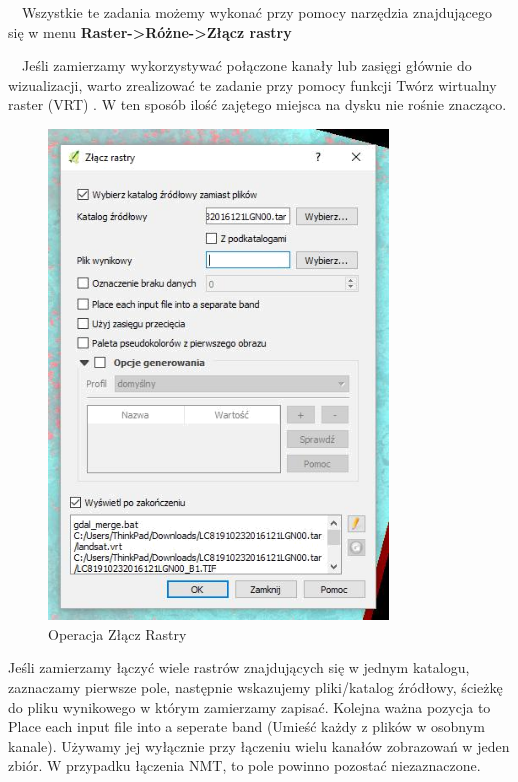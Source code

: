 \documentclass[12pt,a4paper]{book}
\begin{document}
\ \ Wszystkie te zadania możemy wykonać przy pomocy narzędzia znajdującego się w menu \textbf{Raster-{\textgreater}Różne-{\textgreater}Złącz rastry}

\ \ Jeśli zamierzamy wykorzystywać połączone kanały lub zasięgi głównie do wizualizacji, warto zrealizować te zadanie przy pomocy funkcji  Twórz wirtualny raster (VRT) . W ten sposób ilość zajętego miejsca na dysku nie rośnie znacząco.
\begin{figure}[!ht]
	\centering
	\includegraphics[height=13cm]{004-zlacz-rastry.png}
	\caption{Operacja Złącz Rastry}
\end{figure}

Jeśli zamierzamy łączyć wiele rastrów znajdujących się w jednym katalogu, zaznaczamy pierwsze pole, następnie wskazujemy pliki/katalog źródłowy, ścieżkę do pliku wynikowego w którym zamierzamy zapisać. Kolejna ważna pozycja to  Place each input file into a seperate band  (Umieść każdy z plików w osobnym kanale). Używamy jej wyłącznie przy łączeniu wielu kanałów zobrazowań w jeden zbiór. W przypadku łączenia NMT, to pole powinno pozostać niezaznaczone.
\end{document}
